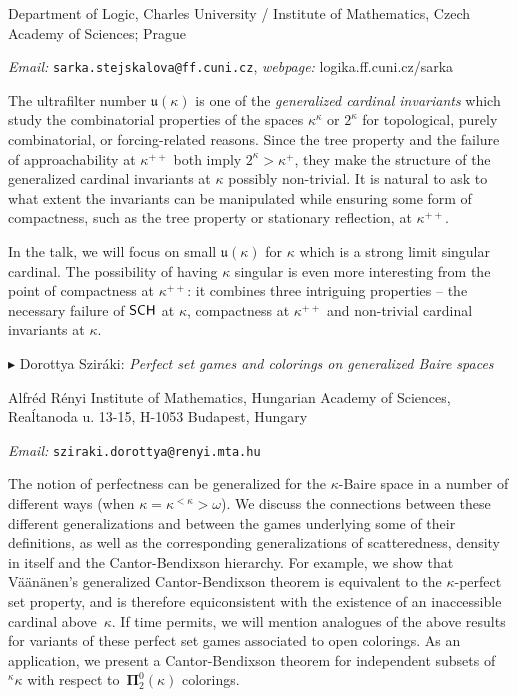 \documentclass[a4paper]{amsart}
\theoremstyle{remark}
\newcommand{\vsp}{\vspace{20pt}}
\begin{document}
\noindent 
Department of Logic, Charles University  / Institute of Mathematics, Czech Academy of Sciences; Prague

\noindent 
\emph{Email:} \texttt{sarka.stejskalova@ff.cuni.cz}, \emph{webpage:} logika.ff.cuni.cz/sarka 

The ultrafilter number $\mathfrak{u}(\kappa)$ is one of the \emph{generalized cardinal invariants} which study the combinatorial properties of the spaces $\kappa^\kappa$ or $2^\kappa$ for topological, purely combinatorial, or forcing-related reasons. Since the tree property and the failure of approachability at $\kappa^{++}$ both imply $2^\kappa>\kappa^+$, they make the structure of the generalized cardinal invariants at $\kappa$ possibly non-trivial. It is natural to ask to what extent the invariants can be manipulated while ensuring some form of compactness, such as the tree property or stationary reflection, at $\kappa^{++}$.

In the talk, we will focus on small $\mathfrak{u}(\kappa)$ for $\kappa$ which is a strong limit singular cardinal. The possibility of having $\kappa$ singular is even more interesting from the point of compactness at $\kappa^{++}$: it combines three intriguing properties -- the necessary failure of $\sf SCH
$ at $\kappa$, compactness at $\kappa^{++}$ and non-trivial cardinal invariants at $\kappa$. 







\vsp 

\noindent 
$\blacktriangleright$ Dorottya Szir\'aki: \emph{Perfect set games and colorings on generalized Baire spaces} 

\noindent 
Alfr\'ed R\'enyi Institute of Mathematics, Hungarian Academy of Sciences, Rea\'ltanoda u. 13-15, H-1053 Budapest, Hungary

\noindent 
\emph{Email:} \texttt{sziraki.dorottya@renyi.mta.hu} 

The notion of perfectness can be generalized
for the $\kappa$-Baire space
in a number of different ways (when $\kappa=\kappa^{<\kappa}>\omega$). 
We 
discuss
the connections between 
these different generalizations and between 
the games underlying some of their definitions, 
as well as 
the corresponding generalizations of 
scatteredness,
density in itself 
and the Cantor-Bendixson hierarchy.
For example, we show that V\"a\"an\"anen's generalized Cantor-Bendixson theorem is equivalent to the $\kappa$-perfect set property, and is therefore equiconsistent with the existence of an inaccessible cardinal above~$\kappa$. 
If time permits, we will mention 
analogues of the above results
for variants of these
perfect set games associated to open colorings.
As an application, we present 
a Cantor-Bendixson theorem
for independent subsets of ${}^\kappa\kappa$ with respect to~$\mathbf{\Pi}^0_2(\kappa)$ colorings.
\end{document}
